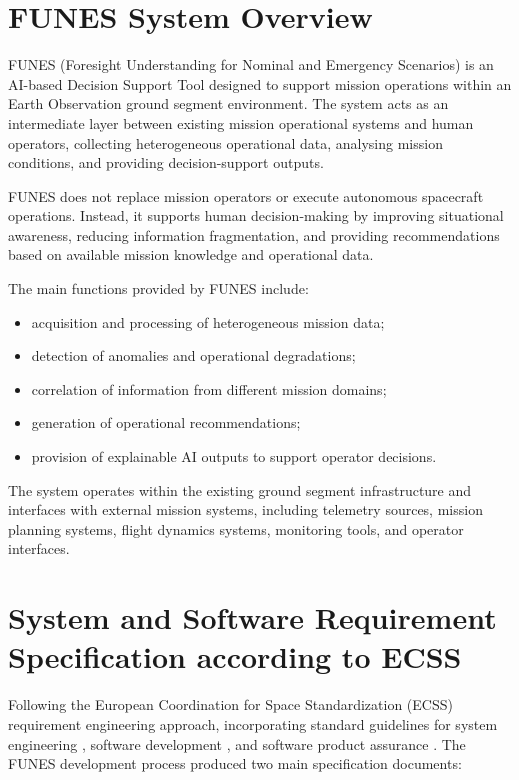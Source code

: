 \section{FUNES System Overview}

FUNES (Foresight Understanding for Nominal and Emergency Scenarios) is an AI-based Decision Support Tool designed to support mission operations within an Earth Observation ground segment environment. The system acts as an intermediate layer between existing mission operational systems and human operators, collecting heterogeneous operational data, analysing mission conditions, and providing decision-support outputs.

FUNES does not replace mission operators or execute autonomous spacecraft operations. Instead, it supports human decision-making by improving situational awareness, reducing information fragmentation, and providing recommendations based on available mission knowledge and operational data.

The main functions provided by FUNES include:

\begin{itemize}
    \item acquisition and processing of heterogeneous mission data;
    \item detection of anomalies and operational degradations;
    \item correlation of information from different mission domains;
    \item generation of operational recommendations;
    \item provision of explainable AI outputs to support operator decisions.
\end{itemize}

The system operates within the existing ground segment infrastructure and interfaces with external mission systems, including telemetry sources, mission planning systems, flight dynamics systems, monitoring tools, and operator interfaces.



\section{System and Software Requirement Specification according to ECSS}

Following the European Coordination for Space Standardization (ECSS) requirement engineering approach, incorporating standard guidelines for system engineering \cite{ecss-e-st-10c-rev1}, software development \cite{ecss-e-st-40c-rev1}, and software product assurance \cite{ecss-q-st-80c-rev2}. The FUNES development process produced two main specification documents:

